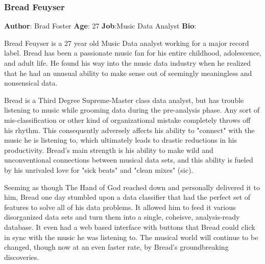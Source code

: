 \documentclass[12pt,oneside,letterpaper]{article}
\begin{document}
\subsubsection{Bread Feuyser}
\textbf{Author}: Brad Foster\newline
\textbf{Age}: 27\newline
\textbf{Job}:Music Data Analyst\newline
\textbf{Bio}:\newline
\par Bread Feuyser is a 27 year old Music Data analyst working for a major record label. Bread has been a passionate music fan for his entire childhood, adolescence, and adult life. He found his way into the music data industry when he realized that he had an unusual ability to make sense out of seemingly meaningless and nonsensical data. 
\par Bread is a Third Degree Supreme-Master class data analyst, but has trouble listening to music while grooming data during the pre-analysis phase. Any sort of mis-classification or other kind of organizational mistake completely throws off his rhythm. This consequently adversely affects his ability to "connect" with the music he is listening to, which ultimately leads to drastic reductions in his productivity. Bread's main strength is his ability to make wild and unconventional connections between musical data sets, and this ability is fueled by his unrivaled love for "sick beats" and "clean mixes" (sic).
\par Seeming as though The Hand of God reached down and personally delivered it to him, Bread one day stumbled upon a data classifier that had the perfect set of features to solve all of his data problems. It allowed him to feed it various disorganized data sets and turn them into a single, coheisve, analysis-ready database. It even had a web based interface with buttons that Bread could click in sync with the music he was listening to. The musical world will continue to be changed, though now at an even faster rate, by Bread's groundbreaking discoveries.\newline
\end{document}
